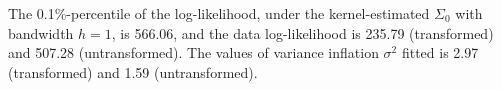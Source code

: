 The 0.1\%-percentile of the log-likelihood, under the kernel-estimated $\Sigma_0$ with bandwidth $h=1$, is 566.06, and the data log-likelihood is 235.79 (transformed) and 507.28 (untransformed). The values of variance inflation $\sigma^2$ fitted is 2.97 (transformed) and 1.59 (untransformed).%